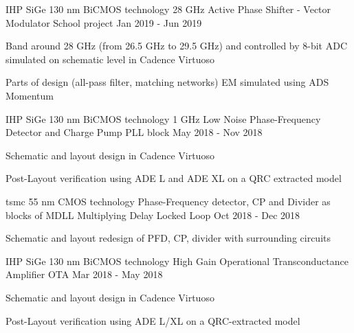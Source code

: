 \begin{cventries}

\cventry
{IHP SiGe 130 nm BiCMOS technology} %
{28 GHz Active Phase Shifter - Vector Modulator} %
{School project} %
{Jan 2019 - Jun 2019} %
{ %
\begin{cvitems}
    \item {Band around 28 GHz (from 26.5 GHz to 29.5 GHz) and controlled by 8-bit ADC simulated on schematic level in Cadence Virtuoso}
    \item {Parts of design (all-pass filter, matching networks) EM simulated using ADS Momentum}
\end{cvitems} 
}


\cventry
{IHP SiGe 130 nm BiCMOS technology} %
{1 GHz Low Noise Phase-Frequency Detector and Charge Pump} %
{PLL block} %
{May 2018 - Nov 2018} %
{ %
\begin{cvitems}
    \item {Schematic and layout design in Cadence Virtuoso}
    \item {Post-Layout verification using ADE L and ADE XL on a QRC extracted model}
\end{cvitems}
}


\cventry
{tsmc 55 nm CMOS technology} %
{Phase-Frequency detector, CP and Divider as blocks of MDLL} %
{Multiplying Delay Locked Loop} %
{Oct 2018 - Dec 2018} %
{ %
\begin{cvitems}
    \item {Schematic and layout redesign of PFD, CP, divider with surrounding circuits}
\end{cvitems}
}

\cventry
{IHP SiGe 130 nm BiCMOS technology} %
{High Gain Operational Transconductance Amplifier} %
{OTA} %
{Mar 2018 - May 2018} %
{ %
\begin{cvitems}
    \item {Schematic and layout design in Cadence Virtuoso}
    \item {Post-Layout verification using ADE L/XL on a QRC-extracted model}
\end{cvitems}
}


\end{cventries}
